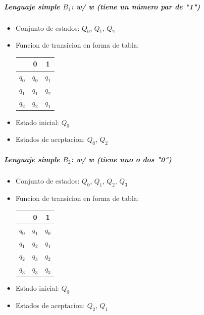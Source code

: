 \documentclass[a4paper, 12pt]{article}
\begin{document}

\subparagraph{Lenguaje simple \( B_1 \): w/ w (tiene un número par de "1")}

\begin{itemize}
    \item Conjunto de estados: \( Q_0 \),  \( Q_1 \), \( Q_2 \)
    \item Funcion de transicion en forma de tabla:
    \newline

    \hspace{5cm}
    \begin{tabular}{|c|c|c|}
    \hline
     & 0 & 1 \\
    \hline
    \( q_0 \) & \( q_0 \) & \( q_1 \) \\
    
    \( q_1 \) & \( q_1 \) & \( q_2 \) \\

    \( q_2 \) & \( q_2 \) & \( q_1 \) \\

    \hline
    \end{tabular}

    \item Estado inicial: \( Q_0 \)
    \item Estados de aceptacion: \( Q_0 \), \( Q_2 \)
    
\end{itemize}


\subparagraph{Lenguaje simple \( B_2 \): w/ w (tiene uno o dos "0")}

\begin{itemize}
    \item Conjunto de estados: \( Q_0 \),  \( Q_1 \), \( Q_2 \), \( Q_3 \)
    \item Funcion de transicion en forma de tabla:
    \newline

    \hspace{5cm}
    \begin{tabular}{|c|c|c|}
    \hline
     & 0 & 1 \\
    \hline
    \( q_0 \) & \( q_1 \) & \( q_0 \) \\
    
    \( q_1 \) & \( q_2 \) & \( q_1 \) \\

    \( q_2 \) & \( q_3 \) & \( q_2 \) \\

    \( q_3 \) & \( q_3 \) & \( q_3 \) \\

    \hline
    \end{tabular}

    \item Estado inicial: \( Q_0 \)
    \item Estados de aceptacion: \( Q_2 \), \( Q_1 \)
    
\end{itemize}
\end{document}
